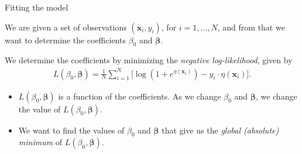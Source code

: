 \documentclass[8pt]{beamer}
\newcommand{\mys}{\vspace{0.5cm} \pause
}
\begin{document}
\begin{frame}{\color{white} Fitting the model}

We are given a set of observations $(\bm{x}_i, y_i)$, for $i = 1, \ldots, N$, and from that we want to determine the coefficients $\beta_0$ and $\bm{\beta}$. \mys

We determine the coefficients by minimizing the \textit{negative log-likelihood}, given by 
\begin{align}
    \label{negloglike}
    L(\beta_0, \bm{\beta}) = \frac{1}{N} \sum_{i = 1}^N \Big[ \log \left(1 + e^{\eta(\bm{x}_i)}  \right)  - y_i \cdot \eta(\bm{x}_i) \Big].
\end{align}
\begin{itemize}
    \item $L(\beta_0, \bm{\beta})$ is a function of the coefficients. As we change $\beta_0$ and $\bm{\beta}$, we change the value of $L(\beta_0, \bm{\beta})$.
    \item We want to find the values of $\beta_0$ and $\bm{\beta}$ that give us the \textit{global (absolute) minimum} of $L(\beta_0, \bm{\beta})$.
\end{itemize}
    
\end{frame}
\end{document}
